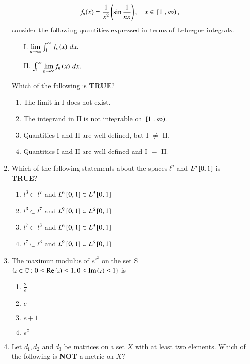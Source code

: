 \documentclass[journal]{IEEEtran}
\begin{document}
\begin{enumerate}
\begin{align}
f_n(x) = \frac{1}{x^2} \left(\sin\frac{1}{n x}\right), \quad x \in {}\left[1\right., \left.\infty\right),
\end{align}
consider the following quantities expressed in terms of Lebesgue integrals:
\begin{enumerate}
    \item[I.] $\lim\limits_{n \to \infty} \int_1^\infty f_x\left(x\right) \, dx.$
    \item[II.] $\int_1^\infty \lim\limits_{n \to \infty} f_n\left(x\right) \, dx.$
\end{enumerate}
Which of the following is \textbf{TRUE}?
\begin{enumerate}
    \item The limit in I does not exist.
    \item The integrand in II is not integrable on ${}\left[1\right., \left.\infty\right)$.
    \item Quantities I and II are well-defined, but I $\neq$ II.
    \item Quantities I and II are well-defined and I $=$ II.
\end{enumerate}
\item Which of the following statements about the spaces $l^p$ and $L^p{}\left[0, 1\right]$ is \textbf{TRUE}?
\begin{enumerate}
    \item $l^3 \subset l^7$ and $L^6{}\left[0, 1\right] \subset L^9{}\left[0, 1\right]$
    \item $l^3 \subset l^7$ and $L^9{}\left[0, 1\right] \subset L^6{}\left[0, 1\right]$
    \item $l^7 \subset l^3$ and $L^6{}\left[0, 1\right] \subset L^9{}\left[0, 1\right]$
    \item $l^7 \subset l^3$ and $L^9{}\left[0, 1\right] \subset L^6{}\left[0, 1\right]$
\end{enumerate}
\item The maximun modulus of $e^{z^2}$ on the set S=$\left\{ z \in \mathbb{C} : 0 \leq \text{Re}\left(z\right) \leq 1, 0 \leq \text{Im}\left(z\right) \leq 1\right\}$ is
\begin{enumerate}
    \item $\frac{2}{e}$
    \item $e$
    \item $e+1$
    \item $e^2$
\end{enumerate}
\item Let $d_1, d_2$ and $d_3$ be matrices on a set $X$ with at least two elements. Which of the following is \textbf{NOT} a metric on $X$?

\end{enumerate}
\end{document}
